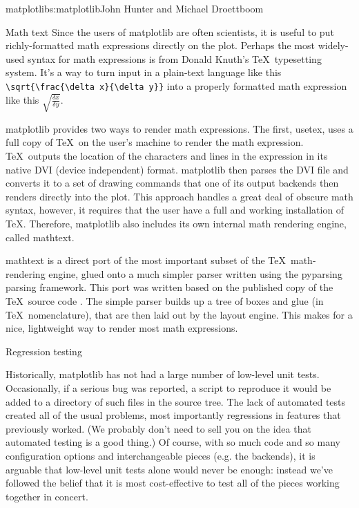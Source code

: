 \begin{aosachapter}{matplotlib}{s:matplotlib}{John Hunter and Michael Droettboom}
\begin{aosasect1}{Math text}
Since the users of matplotlib are often scientists, it is useful to
put richly-formatted math expressions directly on the plot.  Perhaps
the most widely-used syntax for math expressions is from Donald
Knuth's \TeX\ typesetting system.  It's a way to turn input in a
plain-text language like this \verb+\sqrt{\frac{\delta x}{\delta y}}+
into a properly formatted math expression like this
$\sqrt{\frac{\delta x}{\delta y}}$.

matplotlib provides two ways to render math expressions.  The first,
usetex, uses a full copy of \TeX\ on the user's machine to render the
math expression.  \TeX\ outputs the location of the characters and
lines in the expression in its native DVI (device independent) format.
matplotlib then parses the DVI file and converts it to a set of
drawing commands that one of its output backends then renders directly
into the plot.  This approach handles a great deal of obscure math
syntax, however, it requires that the user have a full and working
installation of \TeX.  Therefore, matplotlib also includes its own
internal math rendering engine, called mathtext.

mathtext is a direct port of the most important subset of the
\TeX\ math-rendering engine, glued onto a much simpler parser written
using the pyparsing \cite{bib:pyparsing} parsing framework.  This port
was written based on the published copy of the \TeX\ source code
\cite{bib:texprogram}.  The simple parser builds up a tree of boxes
and glue (in \TeX\ nomenclature), that are then laid out by the
layout engine.  This makes for a nice, lightweight way to render most
math expressions.

\end{aosasect1}

\begin{aosasect1}{Regression testing}

  Historically, matplotlib has not had a large number of low-level
  unit tests.  Occasionally, if a serious bug was reported, a script
  to reproduce it would be added to a directory of such files in the
  source tree.  The lack of automated tests created all of the usual
  problems, most importantly regressions in features that previously
  worked.  (We probably don't need to sell you on the idea that
  automated testing is a good thing.)  Of course, with so much code
  and so many configuration options and interchangeable pieces
  (e.g. the backends), it is arguable that low-level unit tests alone
  would never be enough: instead we've followed the belief that it is
  most cost-effective to test all of the pieces working together in
  concert.


\end{aosasect1}
\end{aosachapter}
